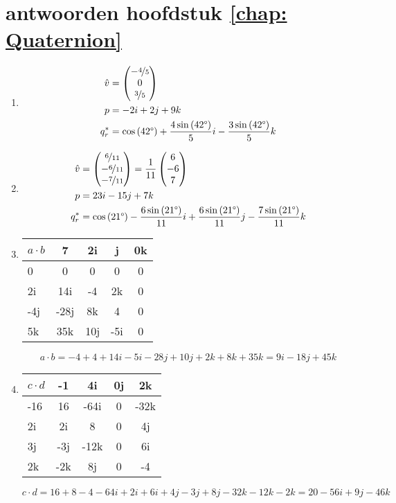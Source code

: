 \section{antwoorden  hoofdstuk \ref{chap: Quaternion}}
\begin{enumerate}
	\item 
    \begin{align*}
        \hat{v} &= \begin{pmatrix} -\nicefrac{4}{5} \\ 0 \\ \nicefrac{3}{5} \end{pmatrix} \\
    	   p &= -2i +2j + 9k \\
    	 q^*_r &= \cos\left(42 \degree\right) 
                 + \frac{4 \sin\left(42 \degree\right)}{5}i
                 - \frac{3 \sin\left(42 \degree\right)}{5}k
    \end{align*}
	
	
	\item 
    \begin{align*}
       \hat{v} &= \begin{pmatrix} \nicefrac{6}{11} \\ -\nicefrac{6}{11} \\ -\nicefrac{7}{11} \end{pmatrix} 
                = \frac{1}{11}\begin{pmatrix} 6 \\ -6 \\ 7 \end{pmatrix} \\
	      p  &= 23i - 15j + 7k \\
	  q^*_r  &= \cos\left(21\degree\right) 
                - \frac{6 \sin\left(21 \degree\right)}{11}i
	          + \frac{6 \sin\left(21 \degree\right)}{11}j
	          - \frac{7 \sin\left(21 \degree\right)}{11}k
	\end{align*}
 
	\item
	\begin{NiceTabular}{ | a | c | c | c | c |}
		\hline
         \RowStyle{\color{white}} %
	$ a\cdot b $ & 7    & 2i  & j   & 0k \\     & 0    & 0   & 0   & 0  \\ \hline
		  2i   & 14i  & -4  & 2k  & 0  \\ \hline
		  -4j  & -28j &  8k & 4   & 0  \\ \hline
		  5k   & 35k  & 10j & -5i & 0  \\ 
		\hline 
	\end{NiceTabular}
	\[ a\cdot b = -4 + 4 +14i -5i -28j +10j +2k + 8k + 35k =  9i -18j +45k \]
	
	\item
	\begin{NiceTabular}{ | a | c | c | c | c |}
		\hline
         \RowStyle{\color{white}} %
		$ c\cdot d $ & -1  & 4i   & 0j & 2k \\       & 16  & -64i & 0  & -32k  \\ \hline
		       2i     & 2i  & 8    & 0  & 4j  \\ \hline
		       3j     & -3j & -12k & 0  & 6i\\ \hline
		       2k     & -2k & 8j   & 0  & -4\\ 
		\hline 
	\end{NiceTabular}
	\[c\cdot d = 16 +8  -4  -64i +2i +6i  +4j -3j +8j -32k -12k -2k =  20-56i+9j -46k \]
	

\end{enumerate}
